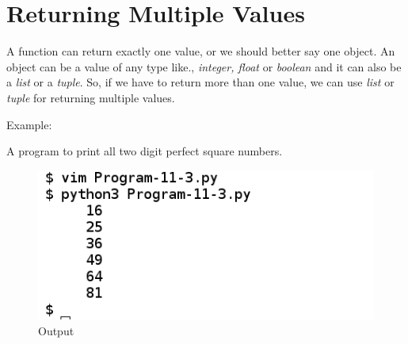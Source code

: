 \documentclass[11pt,a4paper]{article}
\begin{document}
\section*{Returning Multiple Values}
A function can return exactly one value, or we should better say one object. An object can be a value of any type like., \emph{integer, float} or \emph{boolean} and it can also be a \emph{list} or a \emph{tuple}. So, if we have to return more than one value, we can use \emph{list} or \emph{tuple} for returning multiple values.

Example:

\begin{description} 
\item A program to print all two digit perfect square numbers.

\begin{figure}[ht]
\begin{center}
\includegraphics[scale=0.5]{Output-11-3.png}
\caption{Output}
\label{Output-11-3}
\end{center}
\end{figure}

\end{description}
\end{document}
